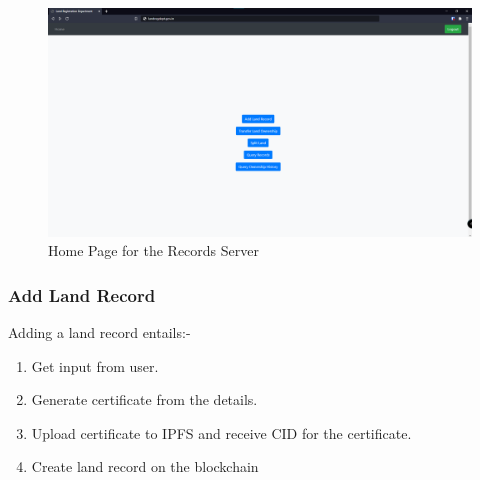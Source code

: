 \documentclass{article}
\begin{document}
        \begin{figure}[htbp]
            \includegraphics[scale=0.25]{records_home}
            \centering
            \caption{Home Page for the Records Server}
        \end{figure}
        
        

        \subsubsection{Add Land Record}
            Adding a land record entails:-
            \begin{enumerate}
                \item Get input from user.
                \item Generate certificate from the details.
                \item Upload certificate to IPFS and receive CID for the certificate.
                \item Create land record on the blockchain
            \end{enumerate}
\end{document}
